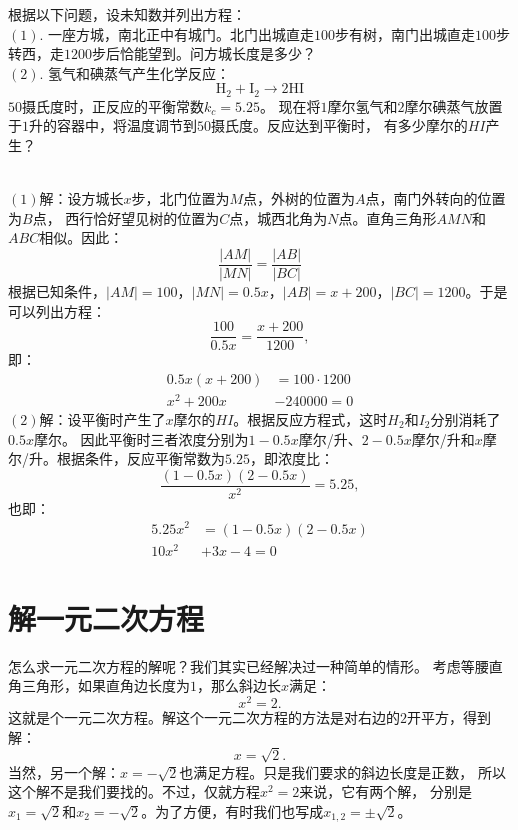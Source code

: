 \documentclass[12pt,UTF8]{ctexbook}
\begin{document}
\begin{ex}\label{ex:4-0-0}
    根据以下问题，设未知数并列出方程：\\
    $(1).$ 一座方城，南北正中有城门。北门出城直走$100$步有树，南门出城直走$100$步转西，走$1200$步后恰能望到。问方城长度是多少？\\
    $(2).$ 氢气和碘蒸气产生化学反应：
    $$\mathrm{H}_2 + \mathrm{I}_2 \longrightarrow 2\mathrm{HI}$$
    $50$摄氏度时，正反应的平衡常数$k_c=5.25$。
    现在将$1$摩尔氢气和$2$摩尔碘蒸气放置于$1$升的容器中，将温度调节到$50$摄氏度。反应达到平衡时，
    有多少摩尔的$HI$产生？
\end{ex}
\begin{so}
    \mbox{} \\
    $(1)$解：设方城长$x$步，北门位置为$M$点，外树的位置为$A$点，南门外转向的位置为$B$点，
    西行恰好望见树的位置为$C$点，城西北角为$N$点。直角三角形$AMN$和$ABC$相似。因此：
    $$ \frac{|AM|}{|MN|} = \frac{|AB|}{|BC|} $$
    根据已知条件，$|AM| = 100$，$|MN| = 0.5x$，$|AB| = x + 200$，$|BC| = 1200$。于是可以列出方程：
    $$ \frac{100}{0.5x} = \frac{x + 200}{1200}, $$
    即：
    \begin{align*}
        0.5x(x + 200) &= 100 \cdot 1200  \\
        x^2 + 200x &- 240000 = 0  
    \end{align*} 
    $(2)$解：设平衡时产生了$x$摩尔的$HI$。根据反应方程式，这时$H_2$和$I_2$分别消耗了$0.5x$摩尔。
    因此平衡时三者浓度分别为$1 - 0.5x$摩尔/升、$2 - 0.5x$摩尔/升和$x$摩尔/升。根据条件，反应平衡常数为$5.25$，即浓度比：
    $$ \frac{(1 - 0.5x)(2 - 0.5x)}{x^2} = 5.25,$$
    也即：
    \begin{align*}
        5.25 x^2 &= \left(1 - 0.5x\right)\left(2 - 0.5x\right)  \\
        10 x^2 &+ 3x - 4 = 0 
    \end{align*} 
\end{so}

\section{解一元二次方程}
怎么求一元二次方程的解呢？我们其实已经解决过一种简单的情形。
考虑等腰直角三角形，如果直角边长度为$1$，那么斜边长$x$满足：
$$x^2 = 2.$$
这就是个一元二次方程。解这个一元二次方程的方法是对右边的$2$开平方，得到解：
$$ x = \sqrt{2}.$$
当然，另一个解：$x = -\sqrt{2}$也满足方程。只是我们要求的斜边长度是正数，
所以这个解不是我们要找的。不过，仅就方程$ x^2 = 2$来说，它有两个解，
分别是$x_1 = \sqrt{2}$和$x_2 = -\sqrt{2}$。为了方便，有时我们也写成$x_{1,2} = \pm\sqrt{2}$。
\end{document}
